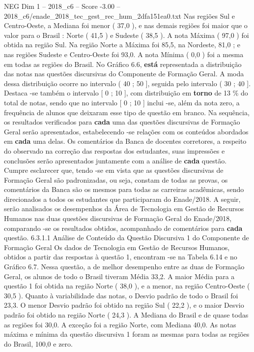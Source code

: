 \begin{textsample}{NEG Dim 1 – 2018\_c6 – Score -3.00 – 2018\_c6/enade\_2018\_tec\_gest\_rec\_hum\_2dfa151ea0.txt}
Nas regiões Sul e Centro-Oeste, a Mediana foi menor ( 37,0 ), e nas demais regiões foi maior que o valor para o Brasil : Norte ( 41,5 ) e Sudeste ( 38,5 ).
A nota Máxima ( 97,0 ) foi obtida na região Sul.
Na região Norte a Máxima foi 85,5, na Nordeste, 81,0 ; e nas regiões Sudeste e Centro-Oeste foi 93,0.
A nota Mínima ( 0,0 ) foi a mesma em todas as regiões do Brasil.
No Gráfico 6.6, \textbf{está} representada a distribuição das notas nas questões discursivas do Componente de Formação Geral.
A moda dessa distribuição ocorre no intervalo ( 40 ; 50 ], seguida pelo intervalo ( 30 ; 40 ].
Destaca -se também o intervalo [ 0 ; 10 ], com distribuição em \textbf{torno} de 13 \% do total de notas, sendo que no intervalo [ 0 ; 10 ] inclui -se, além da nota zero, a frequência de alunos que deixaram esse tipo de questão em branco.
Na sequência, os resultados verificados para \textbf{cada} uma das questões discursivas de Formação Geral serão apresentados, estabelecendo -se relações com os conteúdos abordados em \textbf{cada} uma delas.
Os comentários da Banca de docentes corretores, a respeito do observado na correção das respostas dos estudantes, suas impressões e conclusões serão apresentados juntamente com a análise de \textbf{cada} questão.
Cumpre esclarecer que, tendo -se em vista que as questões discursivas de Formação Geral são padronizadas, ou seja, constam de todas as provas, os comentários da Banca são os mesmos para todas as carreiras acadêmicas, sendo direcionados a todos os estudantes que participaram do Enade/2018.
A seguir, serão analisados os desempenhos da Área de Tecnologia em Gestão de Recursos Humanos nas duas questões discursivas de Formação Geral do Enade/2018, comparando -se os resultados obtidos, acompanhado de comentários para \textbf{cada} questão. 6.3.1.1 Análise de Conteúdo da Questão Discursiva 1 do Componente de Formação Geral Os dados de Tecnologia em Gestão de Recursos Humanos, obtidos a partir das respostas à questão 1, encontram -se na Tabela 6.14 e no Gráfico 6.7.
Nessa questão, a de melhor desempenho entre as duas de Formação Geral, os alunos de todo o Brasil tiveram Média 33,2.
A maior Média para a questão 1 foi obtida na região Norte ( 38,0 ), e a menor, na região Centro-Oeste ( 30,5 ).
Quanto à variabilidade das notas, o Desvio padrão de todo o Brasil foi 23,3.
O menor Desvio padrão foi obtido na região Sul ( 22,2 ), e o maior Desvio padrão foi obtido na região Norte ( 24,3 ).
A Mediana do Brasil e de quase todas as regiões foi 30,0.
A exceção foi a região Norte, com Mediana 40,0.
As notas máxima e mínima da questão discursiva 1 foram as mesmas para todas as regiões do Brasil, 100,0 e zero.

\end{textsample}

